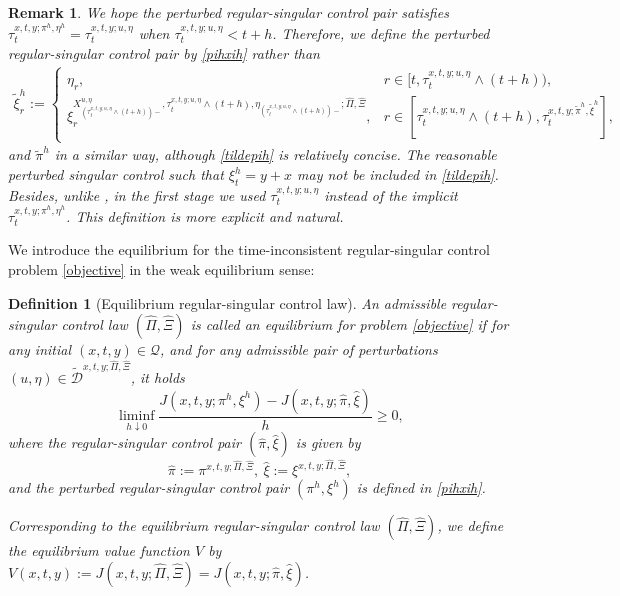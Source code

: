 \documentclass[11pt,reqno]{article}%
\newtheorem{definition}[theorem]{Definition}
\newtheorem{remark}[theorem]{Remark}
\numberwithin{equation}{section}
\begin{document}
\begin{remark}
We hope the perturbed regular-singular control pair satisfies $\tau^{x,t,y;\pi^h,\eta^h}_{t}=\tau^{x,t,y;u,\eta}_{t}$ when $\tau^{x,t,y;u,\eta}_{t}<t+h$. Therefore, we define the perturbed regular-singular control pair by \eqref{pihxih} rather than
\begin{equation}
\begin{aligned}
\tilde\xi^{h}_{r}:=\begin{cases}
\eta_{r}, & r\in[t,\tau^{x,t,y;u,\eta}_{t}\wedge(t+h)),\\
\xi^{X^{u,\eta}_{(\tau^{x,t,y;u,\eta}_{t}\wedge(t+h))-},\tau^{x,t,y;u,\eta}_{t}\wedge(t+h),\eta_{(\tau^{x,t,y;u,\eta}_{t}\wedge(t+h))-};\hat{\Pi},\hat{\Xi}}_{r}, & r\in[\tau^{x,t,y;u,\eta}_{t}\wedge(t+h),\tau^{x,t,y;\tilde\pi^h,\tilde\xi^h}_{t}],
\end{cases}
\end{aligned}\label{tildepih}
\end{equation}
and $\tilde\pi^{h}$ in a similar way, although \eqref{tildepih} is relatively concise. The reasonable perturbed singular control such that $\xi^h_t=y+x$ may not be included in \eqref{tildepih}. Besides, unlike \citet{cao2026equilibrium}, in the first stage we used $\tau^{x,t,y;u,\eta}_{t}$ instead of the implicit $\tau^{x,t,y;\pi^h,\eta^h}_{t}$. This definition is more explicit and natural. 
\end{remark}


We introduce the equilibrium for the time-inconsistent regular-singular control problem \eqref{objective} in the weak equilibrium sense: 
\begin{definition}[Equilibrium regular-singular control law]
\label{equil}
An admissible regular-singular control law $\left(\hat{\Pi},\hat{\Xi}\right)$ is called an equilibrium for problem \eqref{objective} if for any initial $(x,t,y)\in\mathcal{Q}$, and for any admissible pair of perturbations $(u,\eta)\in\mathcal{\tilde D}^{x,t,y;\hat\Pi,\hat\Xi}$, it holds 
\begin{equation}
\label{equicond}
\liminf\limits_{h\downarrow 0}\frac{J\left(x,t,y;\pi^{h},\xi^{h}\right)-J\left(x,t,y;\hat{\pi},\hat{\xi}\right)}{h}\ge 0,
\end{equation}
where the regular-singular control pair $\left(\hat{\pi},\hat{\xi}\right)$ is given by 
\begin{equation}\label{hatpixi}\hat{\pi}:=\pi^{x,t,y;\hat{\Pi},\hat{\Xi}}, \ \hat{\xi}:=\xi^{x,t,y;\hat{\Pi},\hat{\Xi}},\end{equation}
and the perturbed regular-singular control pair $\left(\pi^{h},\xi^{h}\right)$ is defined in \eqref{pihxih}.

 Corresponding to the equilibrium regular-singular control law $\left(\hat{\Pi},\hat{\Xi}\right)$, we define the equilibrium value function $V$ by $V(x,t,y):=J\left(x,t,y;\hat{\Pi},\hat{\Xi}\right)=J\left(x,t,y;\hat{\pi},\hat{\xi}\right)$.
\end{definition}
\end{document}
